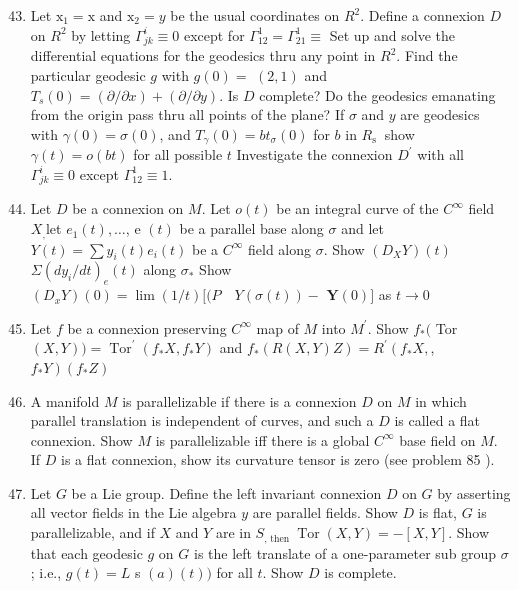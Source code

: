 \documentclass[10pt]{article}
\begin{document}
\begin{enumerate}
  \setcounter{enumi}{42}
  \item Let $\mathrm{x}_{1}=\mathrm{x}$ and $\mathrm{x}_{2}=y$ be the usual coordinates on $R^{2}$. Define a connexion $D$ on $R^{2}$ by letting $\Gamma_{j k}^{i} \equiv 0$ except for $\Gamma_{12}^{1}=\Gamma_{21}^{1} \equiv$ Set up and solve the differential equations for the geodesics thru any point in $R^{2}$. Find the particular geodesic $g$ with $g(0)=$ $(2,1)$ and $T_{s}(0)=(\partial / \partial x)+(\partial / \partial y)$. Is $D$ complete? Do the geodesics emanating from the origin pass thru all points of the plane? If $\sigma$ and $y$ are geodesics with $\gamma(0)=\sigma(0)$, and $T_{\gamma}(0)=b t_{\sigma}(0)$ for $b$ in $R_{\text {s }}$ show $\gamma(t)=o(b t)$ for all possible $t$ Investigate the connexion $D^{\prime}$ with all $\Gamma_{j k}^{i} \equiv 0$ except $\Gamma_{12}^{1} \equiv 1$.

  \item Let $D$ be a connexion on $M$. Let $o(t)$ be an integral curve of the $C^{\infty}$ field $X_{,}$let $e_{1}(t), \ldots$, e $(t)$ be a parallel base along $\sigma$ and let $Y(t)=\sum y_{i}(t) e_{i}(t)$ be a $C^{\infty}$ field along $\sigma .$ Show $\left(D{ }_{X} Y\right)(t)$ $\Sigma\left(d y_{i} / d t\right)_{e}(t)$ along $\sigma_{*}$ Show $\left(D_{x} Y\right)(0)=\lim (1 / t)[(P \quad Y(\sigma(t))-$ $\boldsymbol{Y}(0)]$ as $t \rightarrow 0$

  \item Let $f$ be a connexion preserving $C^{\infty}$ map of $M$ into $M^{\prime}$. Show $f_{*}($ Tor $(X, Y))=\operatorname{Tor}^{\prime}\left(f_{*} X, f_{*} Y\right)$ and $f_{*}(R(X, Y) Z)=R^{\prime}\left(f_{*} X,\right.$, $\left.f_{*} Y\right)\left(f_{*} Z\right)$

  \item A manifold $M$ is parallelizable if there is a connexion $D$ on $M$ in which parallel translation is independent of curves, and such a $D$ is called a flat connexion. Show $M$ is parallelizable iff there is a global $C^{\infty}$ base field on $M$. If $D$ is a flat connexion, show its curvature tensor is zero (see problem 85 ).

  \item Let $G$ be a Lie group. Define the left invariant connexion $D$ on $G$ by asserting all vector fields in the Lie algebra $y$ are parallel fields. Show $D$ is flat, $G$ is parallelizable, and if $X$ and $Y$ are in $S_{\text {, then }} \operatorname{Tor}(X, Y)=-[X, Y]$. Show that each geodesic $g$ on $G$ is the left translate of a one-parameter sub group $\sigma$; i.e., $g(t)=L$ s $(a)(t))$ for all $t$. Show $D$ is complete.


\end{enumerate}
\end{document}
